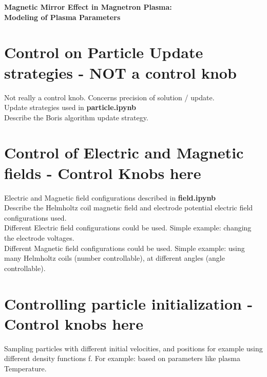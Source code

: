 \documentclass[12pt]{article}
\begin{document}
	
	{\selectfont 
		\begin{center}
			\Large{\textbf{Magnetic Mirror Effect in Magnetron Plasma:}} \\
			\Large{\textbf{Modeling of Plasma Parameters}} \\
		\end{center}
		
		\section{Control on Particle Update strategies - NOT a control knob}
		Not really a control knob. Concerns precision of solution / update. \\
		
		\noindent Update strategies used in \textbf{particle.ipynb}\\
		
		\noindent Describe the Boris algorithm update strategy.
		
		
		
		\section{Control of Electric and Magnetic fields - Control Knobs here}
		Electric and Magnetic field configurations described in \textbf{field.ipynb} \\
		
		
		
		\noindent Describe the Helmholtz coil magnetic field and electrode potential electric field configurations used. \\
		
		\noindent Different Electric field configurations could be used. Simple example: changing the electrode voltages. \\
		
		\noindent Different Magnetic field configurations could be used. Simple example: using many Helmholtz coils (number controllable), at different angles (angle controllable).
		
		
		\section{Controlling particle initialization - Control knobs here}
		Sampling particles with different initial velocities, and positions for example using different density functions f. For example: based on parameters like plasma Temperature. \\
		
}
\end{document}
